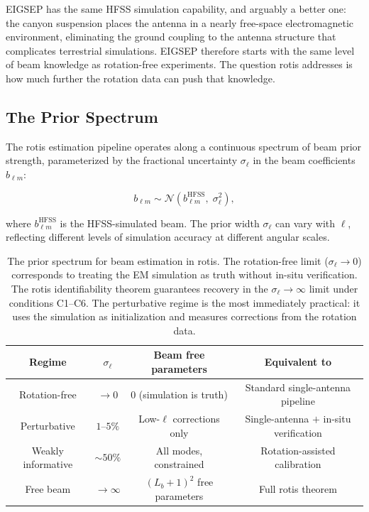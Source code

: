 \documentclass{aastex631}
\newcommand{\blm}{b_{\ell m}}
\theoremstyle{plain}
\theoremstyle{remark}
\begin{document}
EIGSEP has the same HFSS simulation capability, and arguably a
better one: the canyon suspension places the antenna in a nearly
free-space electromagnetic environment, eliminating the ground
coupling to the antenna structure that complicates terrestrial
simulations.
EIGSEP therefore starts with the same level of beam knowledge as
rotation-free experiments.
The question rotis addresses is how much further the rotation data
can push that knowledge.

\subsection{The Prior Spectrum}

The rotis estimation pipeline operates along a continuous spectrum
of beam prior strength, parameterized by the fractional uncertainty
$\sigma_\ell$ in the beam coefficients $\blm$:

\begin{equation}
  \blm \sim \mathcal{N}\!\left(b^\mathrm{HFSS}_{\ell m},\;
  \sigma_\ell^2\right),
\end{equation}

where $b^\mathrm{HFSS}_{\ell m}$ is the HFSS-simulated beam.
The prior width $\sigma_\ell$ can vary with $\ell$, reflecting
different levels of simulation accuracy at different angular scales.

\begin{table}
  \centering
  \begin{tabular}{c|c|c|c}
    \toprule
    \textbf{Regime} & \textbf{$\sigma_\ell$} & \textbf{Beam free parameters}
      & \textbf{Equivalent to} \\
    \midrule
    Rotation-free
      & $\to 0$
      & 0 (simulation is truth)
      & Standard single-antenna pipeline \\
    \hline
    Perturbative
      & $1$--$5\%$
      & Low-$\ell$ corrections only
      & Single-antenna $+$ in-situ verification \\
    \hline
    Weakly informative
      & $\sim 50\%$
      & All modes, constrained
      & Rotation-assisted calibration \\
    \hline
    Free beam
      & $\to \infty$
      & $(L_b+1)^2$ free parameters
      & Full rotis theorem \\
    \bottomrule
  \end{tabular}
  \caption{The prior spectrum for beam estimation in rotis.
    The rotation-free limit ($\sigma_\ell \to 0$) corresponds to
    treating the EM simulation as truth without in-situ verification.
    The rotis identifiability theorem guarantees recovery in the
    $\sigma_\ell \to \infty$ limit under conditions C1--C6.
    The perturbative regime is the most immediately practical:
    it uses the simulation as initialization and measures corrections
    from the rotation data.}
  \label{tab:prior_spectrum}
\end{table}
\end{document}

